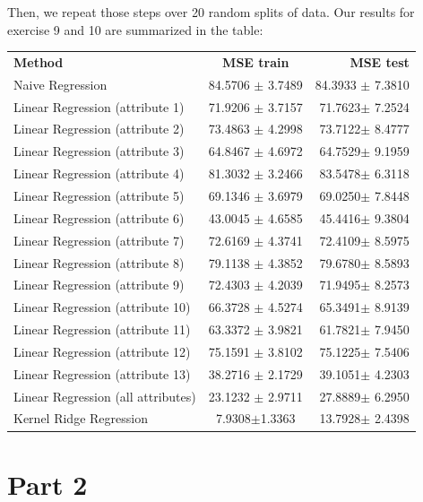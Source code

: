 \documentclass{article} %
\begin{document}
Then, we repeat those steps over 20 random splits of data. Our results for exercise 9 and 10 are summarized in the table:
\begin{center}
\begin{tabular}{|  l c r|}
  \hline
  \textbf{Method} & \textbf{MSE train} & \textbf{MSE test} \\
  Naive Regression & 84.5706 $ \pm $ 3.7489 & 84.3933 $ \pm $ 7.3810\\
 Linear Regression (attribute 1) & 71.9206 $ \pm $ 3.7157& 71.7623$ \pm $ 7.2524\\
  Linear Regression (attribute 2) & 73.4863 $ \pm $ 4.2998& 73.7122$ \pm $ 8.4777\\
 Linear Regression (attribute 3) & 64.8467 $ \pm $ 4.6972& 64.7529$ \pm $ 9.1959\\
 Linear Regression (attribute 4) & 81.3032 $ \pm $ 3.2466& 83.5478$ \pm $ 6.3118 \\
 Linear Regression (attribute 5) & 69.1346 $ \pm $ 3.6979& 69.0250$ \pm $ 7.8448\\
 Linear Regression (attribute 6) & 43.0045 $ \pm $ 4.6585& 45.4416$ \pm $ 9.3804\\
 Linear Regression (attribute 7) & 72.6169 $ \pm $ 4.3741& 72.4109$ \pm $ 8.5975\\
 Linear Regression (attribute 8) & 79.1138 $ \pm $ 4.3852& 79.6780$ \pm $ 8.5893\\
 Linear Regression (attribute 9) & 72.4303 $ \pm $ 4.2039& 71.9495$ \pm $ 8.2573\\
 Linear Regression (attribute 10) & 66.3728 $ \pm $ 4.5274& 65.3491$ \pm $ 8.9139\\
 Linear Regression (attribute 11) & 63.3372 $ \pm $ 3.9821& 61.7821$ \pm $ 7.9450\\
 Linear Regression (attribute 12) & 75.1591 $ \pm $ 3.8102& 75.1225$ \pm $ 7.5406\\
  Linear Regression (attribute 13) & 38.2716 $ \pm $ 2.1729& 39.1051$ \pm $ 4.2303\\
  Linear Regression (all attributes) & 23.1232 $ \pm $ 2.9711& 27.8889$ \pm $ 6.2950\\
 Kernel Ridge Regression  & 7.9308$ \pm $1.3363 & 13.7928$ \pm$ 2.4398\\
  \hline
\end{tabular}
 \label{fig:res}
\end{center}
\section{Part 2}
\end{document}
